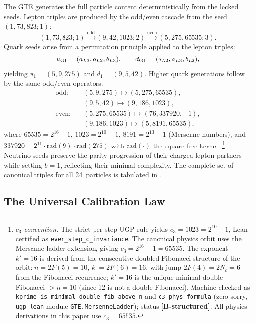 \documentclass[11pt]{article}
\theoremstyle{remark}
\begin{document}
The GTE generates the full particle content deterministically from the locked seeds.
Lepton triples are produced by the odd/even cascade from the seed $(1, 73, 823; 1)$:
\[
(1,73,823;1) \xrightarrow{\text{odd}} (9,42,1023;2) \xrightarrow{\text{even}} (5,275,65535;3).
\]
Quark seeds arise from a permutation principle applied to the lepton triples:
\begin{equation}
u_{\rm G1} = (a_{L3}, a_{L2}, b_{L3}), \qquad d_{\rm G1} = (a_{L2}, a_{L3}, b_{L2}),
\label{eq:perm}
\end{equation}
yielding $u_1 = (5, 9, 275)$ and $d_1 = (9, 5, 42)$.
Higher quark generations follow by the same odd/even operators:
\[
\begin{aligned}
\text{odd:} \quad & (5,9,275) \mapsto (5,275,65535), \\
                  & (9,5,42) \mapsto (9,186,1023), \\[0.25em]
\text{even:} \quad & (5,275,65535) \mapsto (76,337920,-1), \\
                  & (9,186,1023) \mapsto (5,8191,65535),
\end{aligned}
\]
where $65535 = 2^{16} - 1$, $1023 = 2^{10} - 1$, $8191 = 2^{13} - 1$ (Mersenne numbers), and $337920 = 2^{11} \cdot \mathrm{rad}(9) \cdot \mathrm{rad}(275)$ with $\mathrm{rad}(\cdot)$ the square-free kernel.
\footnote{\textit{$c_3$ convention.}
The strict per-step UGP rule yields $c_3 = 1023 = 2^{10}-1$, Lean-certified as \texttt{even\_step\_c\_invariance}.
The canonical physics orbit uses the Mersenne-ladder extension, giving $c_3 = 2^{16}-1 = 65535$.
The exponent $k'=16$ is derived from the consecutive doubled-Fibonacci structure of the orbit: $n = 2F(5) = 10$, $k' = 2F(6) = 16$, with jump $2F(4) = 2N_c = 6$ from the Fibonacci recurrence; $k'=16$ is the unique minimal double Fibonacci $> n=10$ (since 12 is not a double Fibonacci). Machine-checked as \texttt{kprime\_is\_minimal\_double\_fib\_above\_n} and \texttt{c3\_phys\_formula} (zero sorry, \texttt{ugp-lean} module \texttt{GTE.MersenneLadder}); status \textbf{[B-structured]}.
All physics derivations in this paper use $c_3 = 65535$.}
Neutrino seeds preserve the parity progression of their charged-lepton partners while setting $b = 1$, reflecting their minimal complexity.
The complete set of canonical triples for all 24~particles is tabulated in .


\subsection{The Universal Calibration Law}
\label{subsec:ucl}
\end{document}
